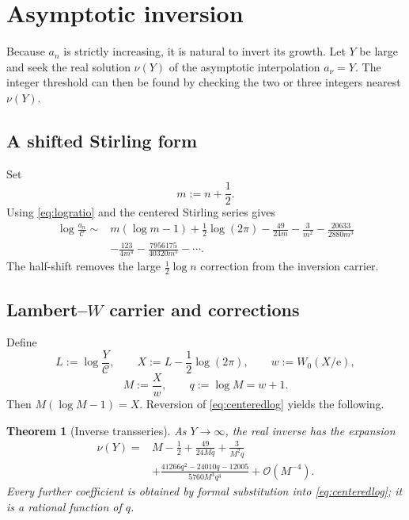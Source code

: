 \documentclass[11pt,a4paper]{article}
\newtheorem{theorem}{Theorem}[section]
\theoremstyle{definition}
\theoremstyle{remark}
\newcommand{\e}{\mathrm{e}}
\newcommand{\bigO}{\mathcal{O}}
\newcommand{\constC}{\mathcal{C}}
\begin{document}
\section{Asymptotic inversion}

Because \(a_n\) is strictly increasing, it is natural to invert its growth.  Let \(Y\) be large and seek the real solution \(\nu(Y)\) of the asymptotic interpolation \(a_\nu=Y\).  The integer threshold can then be found by checking the two or three integers nearest \(\nu(Y)\).

\subsection{A shifted Stirling form}

Set
\begin{equation}\label{eq:mshift}
 m:=n+\frac12.
\end{equation}
Using \eqref{eq:logratio} and the centered Stirling series gives
\begin{equation}\label{eq:centeredlog}
\begin{split}
 \log\frac{a_n}{\constC}
 \sim{}&m(\log m-1)+\frac12\log(2\pi)
 -\frac{49}{24m}-\frac3{m^2}-\frac{20633}{2880m^3}\\
 &-\frac{123}{4m^4}-\frac{7956175}{40320m^5}-\cdots.
\end{split}
\end{equation}
The half-shift removes the large \(\frac12\log n\) correction from the inversion carrier.

\subsection{\texorpdfstring{Lambert--\(W\)}{Lambert-W} carrier and corrections}

Define
\begin{equation}\label{eq:inverse-defs}
 L:=\log\frac{Y}{\constC},\qquad
 X:=L-\frac12\log(2\pi),\qquad
 w:=W_0(X/\e),
\end{equation}
\begin{equation}\label{eq:Mdef}
 M:=\frac{X}{w},\qquad q:=\log M=w+1.
\end{equation}
Then \(M(\log M-1)=X\).  Reversion of \eqref{eq:centeredlog} yields the following.

\begin{theorem}[Inverse transseries]\label{thm:inverse}
As \(Y\to\infty\), the real inverse has the expansion
\begin{equation}\label{eq:inverse}
\begin{split}
 \nu(Y)={}&M-\frac12
 +\frac{49}{24Mq}+\frac{3}{M^2q}\\
 &+\frac{41266q^2-24010q-12005}
 {5760M^3q^3}+\bigO(M^{-4}).
\end{split}
\end{equation}
Every further coefficient is obtained by formal substitution into \eqref{eq:centeredlog}; it is a rational function of \(q\).
\end{theorem}
\end{document}
